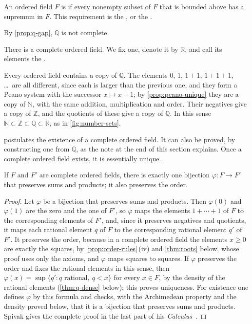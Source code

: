 \begin{definition}
\label{def:complete}
An ordered field $F$ is  if every nonempty subset of $F$ that is bounded above has a supremum in $F$. This requirement is the , or the .
\end{definition}

By \cref{prop:q-gap}, $\mathbb Q$ is not complete.

\begin{assumption}
\label{asm:reals}
There is a complete ordered field. We fix one, denote it by $\mathbb R$, and call its elements the .
\end{assumption}

Every ordered field contains a copy of $\mathbb Q$. The elements $0$, $1$, $1+1$, $1+1+1$, \ldots\ are all different, since each is larger than the previous one, and they form a Peano system with the successor $x\mapsto x+1$; by \cref{prop:peano-unique} they are a copy of $\mathbb N$, with the same addition, multiplication and order. Their negatives give a copy of $\mathbb Z$, and the quotients of these give a copy of $\mathbb Q$. In this sense $\mathbb N\subset\mathbb Z\subset\mathbb Q\subset\mathbb R$, as in \cref{fig:number-sets}.

 postulates the existence of a complete ordered field. It can also be proved, by constructing one from $\mathbb Q$, as the note at the end of this section explains. Once a complete ordered field exists, it is essentially unique.

\begin{theorem}
\label{thm:r-unique}
If $F$ and $F'$ are complete ordered fields, there is exactly one bijection $\varphi\colon F\to F'$ that preserves sums and products; it also preserves the order.
\end{theorem}

\begin{proof}
Let $\varphi$ be a bijection that preserves sums and products. Then $\varphi(0)$ and $\varphi(1)$ are the zero and the one of $F'$, so $\varphi$ maps the elements $1+\cdots+1$ of $F$ to the corresponding elements of $F'$, and, since it preserves negatives and quotients, it maps each rational element $q$ of $F$ to the corresponding rational element $q'$ of $F'$. It preserves the order, because in a complete ordered field the elements $x\ge0$ are exactly the squares, by \cref{prop:order-rules}\,(iv) and \cref{thm:roots} below, whose proof uses only the axioms, and $\varphi$ maps squares to squares. If $\varphi$ preserves the order and fixes the rational elements in this sense, then $\varphi(x)=\sup\{q': q\text{ rational},\ q<x\}$ for every $x\in F$, by the density of the rational elements (\cref{thm:q-dense} below); this proves uniqueness. For existence one defines $\varphi$ by this formula and checks, with the Archimedean property and the density proved below, that it is a bijection that preserves sums and products. Spivak gives the complete proof in the last part of his \emph{Calculus}~\cite{spivak2008calculus}.
\end{proof}

